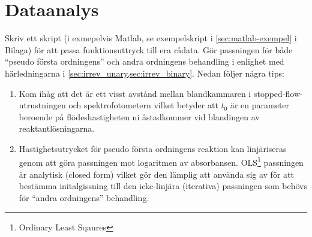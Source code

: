 \section{Dataanalys}
\label{sec:analys}
Skriv ett skript (i exmepelvis Matlab, se exempelskript i
\cref{sec:matlab-exempel} i Bilaga) för att passa funktionsuttryck 
till era rådata. Gör passningen för både ``pseudo första ordningens''
och andra ordningens behandling i enlighet med härledningarna i
\cref{sec:irrev_unary,sec:irrev_binary}. Nedan följer några tips:

\begin{enumerate}
\item Kom ihåg att det är ett visst
avstånd mellan blandkammaren i stopped-flow-utrustningen och
spektrofotometern vilket betyder att $t_0$ är en parameter beroende på
flödeshastigheten ni åstadkommer vid blandingen av reaktantlösningarna.
\item Hastighetsutrycket för pseudo första ordningens reaktion kan
  linjäriseras genom att göra passningen mot logaritmen av
  absorbansen. OLS\footnote{Ordinary Least Sqaures} passningen är
  analytisk (closed form) vilket gör den lämplig att använda sig av för
  att bestämma initalgissning till den icke-linjära (iterativa)
  passningen som behövs för ``andra ordningens'' behandling.
\end{enumerate}


